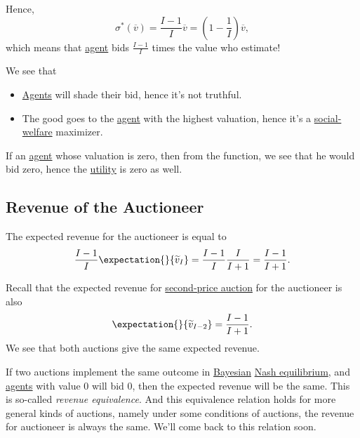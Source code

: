 Hence,
\[
	\sigma^{\ast}(\overline{v}) = \frac{I-1}{I}\overline{v} = (1 - \frac{1}{I})\overline{v},
\]
which means that \hyperref[def:player]{agent} bids \(\frac{I - 1}{I}\) times the value who estimate!

\begin{note}
	We see that
	\begin{itemize}
		\item \hyperref[def:player]{Agents} will shade their bid, hence it's not truthful.
		\item The good goes to the \hyperref[def:player]{agent} with the highest valuation, hence it's a \hyperref[def:social-welfare]{social-welfare} maximizer.
	\end{itemize}
\end{note}

\begin{remark}
	If an \hyperref[def:player]{agent} whose valuation is zero, then from the function, we see that he would bid zero, hence the \hyperref[def:reward]{utility}
	is zero as well.
\end{remark}

\subsection{Revenue of the Auctioneer}
The expected revenue for the auctioneer is equal to
\[
	\frac{I - 1}{I}\expectation{}{\widetilde{v}_I} = \frac{I - 1}{I}\frac{I}{I+1} = \frac{I - 1}{I+1}.
\]

\begin{note}
	Recall that the expected revenue for \hyperref[eg:second-price-auction]{second-price auction} for the auctioneer is also
	\[
		\expectation{}{\widetilde{v}_{I-2}} = \frac{I-1}{I+1}.
	\]
	We see that both auctions give the same expected revenue.
\end{note}

\begin{remark}\label{rmk:revenue-equivalence}
	If two auctions implement the same outcome in \hyperref[def:mathematical-Bayesian-game]{Bayesian} \hyperref[def:Nash-equilibrium]{Nash equilibrium},
	and \hyperref[def:player]{agents} with value \(0\) will bid \(0\), then the expected revenue will be the same.
	This is so-called \emph{revenue equivalence}. And this equivalence relation holds for more general kinds of
	auctions, namely under some conditions of auctions, the revenue for auctioneer is always the same. We'll come back to this
	relation soon.
\end{remark}

